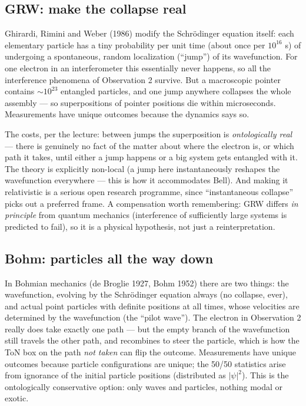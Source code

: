\documentclass[11pt,a4paper]{article}
\theoremstyle{remark}
\begin{document}
\subsection{GRW: make the collapse real}

Ghirardi, Rimini and Weber (1986) modify the Schr\"odinger equation itself: each
elementary particle has a tiny probability per unit time (about once per
$10^{16}$ s) of undergoing a spontaneous, random localization (``jump'') of its
wavefunction. For one electron in an interferometer this essentially never
happens, so all the interference phenomena of Observation 2 survive. But a
macroscopic pointer contains $\sim 10^{23}$ entangled particles, and one jump
anywhere collapses the whole assembly --- so superpositions of pointer positions
die within microseconds. Measurements have unique outcomes because the dynamics
says so.

The costs, per the lecture: between jumps the superposition is
\emph{ontologically real} --- there is genuinely no fact of the matter about
where the electron is, or which path it takes, until either a jump happens or a
big system gets entangled with it. The theory is explicitly non-local (a jump
here instantaneously reshapes the wavefunction everywhere --- this is how it
accommodates Bell). And making it relativistic is a serious open research
programme, since ``instantaneous collapse'' picks out a preferred frame.
A compensation worth remembering: GRW differs \emph{in principle} from quantum
mechanics (interference of sufficiently large systems is predicted to fail), so
it is a physical hypothesis, not just a reinterpretation.

\subsection{Bohm: particles all the way down}

In Bohmian mechanics (de Broglie 1927, Bohm 1952) there are two things: the
wavefunction, evolving by the Schr\"odinger equation always (no collapse,
ever), and actual point particles with definite positions at all times, whose
velocities are determined by the wavefunction (the ``pilot wave''). The electron
in Observation 2 really does take exactly one path --- but the empty branch of the
wavefunction still travels the other path, and recombines to steer the particle,
which is how the ToN box on the path \emph{not taken} can flip the outcome.
Measurements have unique outcomes because particle configurations are unique;
the 50/50 statistics arise from ignorance of the initial particle positions
(distributed as $|\psi|^2$). This is the ontologically conservative option:
only waves and particles, nothing modal or exotic.
\end{document}
